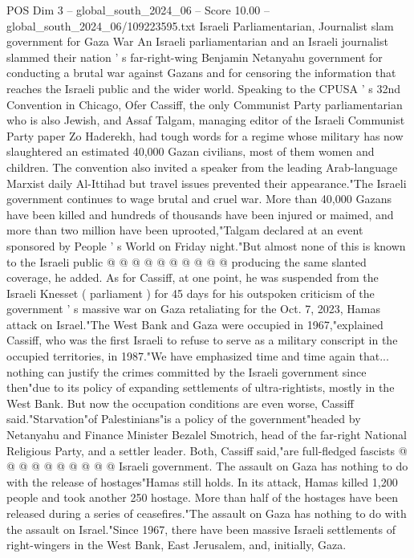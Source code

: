 \begin{textsample}{POS Dim 3 – global\_south\_2024\_06 – Score 10.00 – global\_south\_2024\_06/109223595.txt}  \label{ex:f3_pos_342}
Israeli Parliamentarian, Journalist slam government for Gaza War An Israeli parliamentarian and an Israeli journalist slammed their nation ' s far-right-wing Benjamin Netanyahu government for conducting a brutal war against Gazans and for censoring the information that reaches the Israeli public and the wider world.
Speaking to the CPUSA ' s 32nd Convention in Chicago, Ofer Cassiff, the only Communist Party parliamentarian who is also Jewish, and Assaf Talgam, managing editor of the Israeli Communist Party paper Zo Haderekh, had tough words for a regime whose military has now slaughtered an estimated 40,000 Gazan civilians, most of them women and children.
The convention also invited a speaker from the leading Arab-language Marxist daily Al-Ittihad but travel issues prevented their appearance."The Israeli government continues to wage brutal and cruel war.
More than 40,000 Gazans have been killed and hundreds of thousands have been injured or maimed, and more than two million have been uprooted,"Talgam declared at an event sponsored by People ' s World on Friday night."But almost none of this is known to the Israeli public @ @ @ @ @ @ @ @ @ @ producing the same slanted coverage, he added.
As for Cassiff, at one point, he was suspended from the Israeli Knesset ( parliament ) for 45 days for his outspoken criticism of the government ' s massive war on Gaza retaliating for the Oct. 7, 2023, Hamas attack on Israel."The West Bank and Gaza were occupied in 1967,"explained Cassiff, who was the first Israeli to refuse to serve as a military conscript in the occupied territories, in 1987."We have emphasized time and time again that... nothing can justify the crimes committed by the Israeli government since then"due to its policy of expanding settlements of ultra-rightists, mostly in the West Bank.
But now the occupation conditions are even worse, Cassiff said."Starvation"of Palestinians"is a policy of the government"headed by Netanyahu and Finance Minister Bezalel Smotrich, head of the far-right National Religious Party, and a settler leader.
Both, Cassiff said,"are full-fledged fascists @ @ @ @ @ @ @ @ @ @ Israeli government.
The assault on Gaza has nothing to do with the release of hostages"Hamas still holds.
In its attack, Hamas killed 1,200 people and took another 250 hostage.
More than half of the hostages have been released during a series of ceasefires."The assault on Gaza has nothing to do with the assault on Israel."Since 1967, there have been massive Israeli settlements of right-wingers in the West Bank, East Jerusalem, and, initially, Gaza.

\end{textsample}
